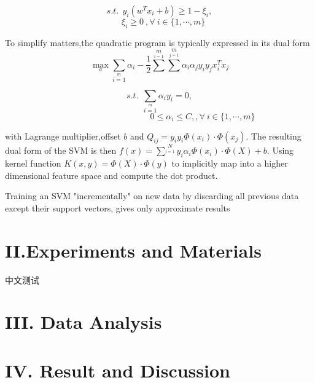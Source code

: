 \documentclass{article}
\begin{document}
$$
s.t. \ \ y_i(w^T x_i + b)\geq 1-\xi_i,
$$
$$
\ \ \ \ \xi_i \geq  0 \ ,\forall \ i \in \{1,\cdots,m\} 
$$

To simplify matters,the quadratic program is typically expressed in its dual form
\begin{equation}
\max_a  \sum_{i=1}\limits^{m} \alpha_i - \frac{1}{2} \sum \limits^{m} \limits_{i=1} \sum \limits^{m} \limits_{j=1} \alpha_i \alpha_j y_i y_j x_i^T x_j \tag{2}
\end{equation}

$$
s.t. \ \ \sum \limits_{i=1} \limits^{m} \alpha_i y_i = 0 ,
$$
$$
     \qquad \qquad \qquad \qquad \qquad 0\leq \alpha_i \leq C, ,\forall \ i \in \{1,\cdots,m\} 
$$



with Lagrange multiplier,offset $b$ and $Q_{ij}=y_i y_i \Phi(x_i) \cdot \Phi(x_j)$. The resulting dual form of the SVM is then $f(x)=\sum^N \limits_{i=1} y_i \alpha_i \Phi(x_i) \cdot \Phi(X) + b$. Using kernel function $K(x,y)=\Phi(X) \cdot \Phi(y)$ to implicitly map into a higher dimensional feature space and compute the dot product.

Training an SVM "incrementally" on new data by discarding all previous data except their support vectors, gives only approximate results 


\section{II.Experiments and Materials}

中文测试


\section{III. Data Analysis}



\section{IV. Result and Discussion}
\end{document}
